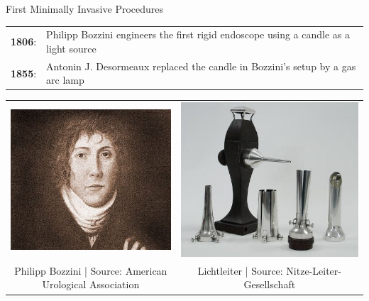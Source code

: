 \begin{frame}{First Minimally Invasive Procedures}

	\begin{tabular}{lp{28em}}
		\textbf{1806}: & Philipp Bozzini engineers the first rigid endoscope using a candle as a light source \\
		\textbf{1855}: & Antonin J. Desormeaux replaced the candle in Bozzini's setup by a gas arc lamp       \\
	\end{tabular}

	\begin{center}
		\begin{tabular}{c c}
			\includegraphics[height=.45\textheight ]{images/BozziniPhilip}        &
			\includegraphics[height=.45\textheight ]{images/lichtleiter}            \\
			\scriptsize Philipp Bozzini | Source: American Urological Association &
			\scriptsize Lichtleiter | Source: Nitze-Leiter-Gesellschaft
		\end{tabular}
	\end{center}

\end{frame}




